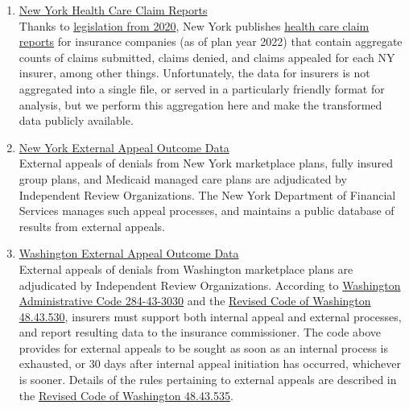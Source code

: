 \documentclass[psamsfonts]{amsart}
\theoremstyle{plain}
\theoremstyle{definition}
\theoremstyle{remark}
\begin{document}
\begin{enumerate}
	
	\item \href{https://www.dfs.ny.gov/reports_and_publications/health_care_claim_reports}{New York Health Care Claim Reports}\\
	
	Thanks to \href{https://www.nysenate.gov/legislation/laws/ISC/345}{legislation from 2020}, New York publishes \href{https://www.dfs.ny.gov/reports_and_publications/health_care_claim_reports}{health care claim reports} for insurance companies (as of plan year 2022) that contain aggregate counts of claims submitted, claims denied, and claims appealed for each NY insurer, among other things. Unfortunately, the data for insurers is not aggregated into a single file, or served in a particularly friendly format for analysis, but we perform this aggregation here and make the transformed data publicly available.\\
	
	
	\item \href{https://www.dfs.ny.gov/public-appeal/search}{New York External Appeal Outcome Data}\\
	
	External appeals of denials from New York marketplace plans, fully insured group plans, and Medicaid managed care plans are adjudicated by Independent Review Organizations. The New York Department of Financial Services manages such appeal processes, and maintains a public database of results from external appeals.\\
	
	
	\item \href{https://fortress.wa.gov/oic/consumertoolkit/Search.aspx?searchtype=indrev}{Washington External Appeal Outcome Data}\\
	
	External appeals of denials from Washington marketplace plans are adjudicated by Independent Review Organizations. According to \href{https://apps.leg.wa.gov/wac/default.aspx?cite=284-43-3030}{Washington Administrative Code 284-43-3030} and the \href{https://app.leg.wa.gov/RCW/default.aspx?cite=48.43.530}{Revised Code of Washington 48.43.530}, insurers must support both internal appeal and external processes, and report resulting data to the insurance commissioner. The code above provides for external appeals to be sought as soon as an internal process is exhausted, or 30 days after internal appeal initiation has occurred, whichever is sooner. Details of the rules pertaining to external appeals are described in the \href{https://app.leg.wa.gov/rcw/default.aspx?cite=48.43.535}{Revised Code of Washington 48.43.535}.\\
	

\end{enumerate}
\end{document}
